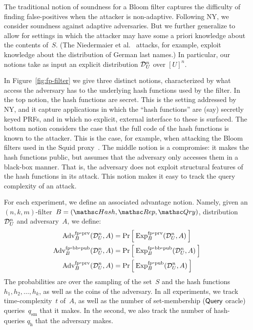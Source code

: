   
The traditional notion of soundness for a Bloom filter captures the difficulty of finding false-positives when the attacker is non-adaptive.  Following NY, we consider soundness against adaptive adversaries.  But we further generalize to allow for settings in which the attacker may have some a priori knowledge about the contents of~$S$. (The Niedermaier et al.~\cite{xxx} attacks, for example, exploit knowledge about the distribution of German last names.)   In particular, our notions take as input an explicit distribution $\mathcal{D}_{U}^{n}$ over $[U]^n$.   

In Figure~\ref{fig:fp-filter} we give three distinct notions, characterized by what access the adversary has to the underlying hash functions used by the filter.  In the top notion, the hash functions are secret.  This is the setting addressed by NY, and it capture applications in which the ``hash functions'' are (say) secretly keyed PRFs, and in which no explicit, external interface to these is surfaced.  
%
The bottom notion considers the case that the full code of the hash functions is known to the attacker.  This is the case, for example, when attacking the Bloom filters used in the Squid proxy~\cite{xxx}.
%
The middle notion is a compromise: it makes the hash functions public, but assumes that the adversary only accesses them in a black-box manner.  That is, the adversary does not exploit structural features of the hash functions in its attack.  This notion makes it easy to track the query complexity of an attack. 

For each experiment, we define an associated advantage notion.  Namely, given an $(n,k,m)$-filter~$B=(\Hash,\Rep,\Qry)$, distribution~$\mathcal{D}_{U}^{n}$ and adversary~$A$, we define:
\begin{align*}
\mathrm{Adv}^{\mathrm{fp\mbox{-}prv}}_{B}(\mathcal{D}_{U}^{n},A) &= \Pr\left[\: \mathrm{Exp}^{\mathrm{fp\mbox{-}prv}}_{B}(\mathcal{D}_{U}^{n},A) \:\right] \\
\mathrm{Adv}^{\mathrm{fp\mbox{-}bb\mbox{-}pub}}_{B}(\mathcal{D}_{U}^{n},A) &= \Pr\left[\: \mathrm{Exp}^{\mathrm{fp\mbox{-}bb\mbox{-}pub}}_{B}(\mathcal{D}_{U}^{n},A) \:\right] \\
\mathrm{Adv}^{\mathrm{fp\mbox{-}prv}}_{B}(\mathcal{D}_{U}^{n},A) &= \Pr\left[\: \mathrm{Exp}^{\mathrm{fp\mbox{-}pub}}_{B}(\mathcal{D}_{U}^{n},A) \:\right]
\end{align*}
The probabilities are over the sampling of the set~$S$ and the hash functions $h_1,h_2,\ldots,h_k$, as well as the coins of the adversary.   In all experiments, we track time-complexity~$t$ of~$A$, as well as the number of set-membership ($\mathsf{Query}$ oracle) queries~$q_{\mathrm{sm}}$ that it makes.   In the second, we also track the number of hash-queries $q_{\mathrm{h}}$ that the adversary makes.


